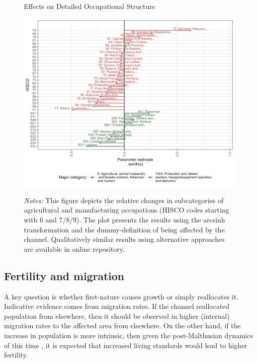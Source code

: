 \documentclass[11pt]{article}
\begin{document}
\begin{figure}
\begin{center}
  \caption{Effects on Detailed Occupational Structure} \label{fig:mech_occ2}
  \includegraphics[width=1\textwidth]{Plots/Mechanism/Detailed6789/Dummy_asi.png}
  \parbox{0.9\textwidth}{
  \caption*{\footnotesize \textit{Notes:} This figure depicts the relative changes in subcategories of agricultural and manufacturing occupations (HISCO codes starting with 6 and 7/8/9). The plot presents the results using the arcsinh transformation and the dummy-definition of being affected by the channel. Qualitatively similar results using alternative approaches are available in online repository.}
}
\end{center}
\end{figure}

\FloatBarrier
\subsection{Fertility and migration}
A key question is whether first-nature causes growth or simply reallocates it. Indicative evidence comes from migration rates. If the channel reallocated population from elsewhere, then it should be observed in higher (internal) migration rates to the affected area from elsewhere. On the other hand, if the increase in population is more intrinsic, then given the post-Malthusian dynamics of this time \citep{Jensen2022, Klemp2016}, it is expected that increased living standards would lead to higher fertility.
\end{document}
